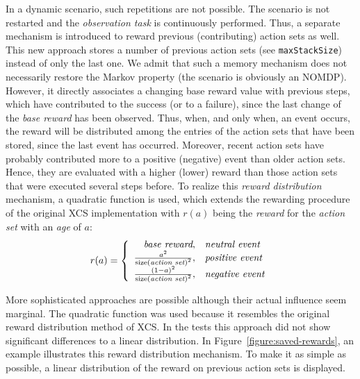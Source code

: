 \documentclass{sig-alternate}
\begin{document}
In a dynamic scenario, such repetitions are not possible. The scenario is not restarted and the \emph{observation task} is continuously performed. Thus, a separate mechanism is introduced to reward previous (contributing) action sets as well. This new approach stores a number of previous action sets (see \verb|maxStackSize|) instead of only the last one. We admit that such a memory mechanism does not necessarily restore the Markov property (the scenario is obviously an NOMDP). However, it directly associates a changing base reward value with previous steps, which have contributed to the success (or to a failure), since the last change of the \emph{base reward} has been observed. %
Thus, when, and only when, an event occurs, the reward will be distributed among the entries of the action sets that have been stored, since the last event has occurred. Moreover, recent action sets have probably contributed more to a positive (negative) event than older action sets. Hence, they are evaluated with a higher (lower) reward than those action sets that were executed several steps before. To realize this \emph{reward distribution} mechanism, a quadratic function is used, which extends the rewarding procedure of the original XCS implementation with $r(a)$ being the \emph{reward} for the \emph{action set} with an \emph{age} of $a$:
$$ %
	r(a) = 
	\left\{ \begin{array}{r@{,\quad}l}
		\emph{base reward} & \mbox{\emph{neutral event}}\\  	
		\frac{{a}^{2}}{{\mathrm{size(\emph{action set})}}^{2}} & \mbox{\emph{positive event}} \\
  		\frac{{(1 - a)}^{2}}{{\mathrm{size(\emph{action set})}}^{2}} & \mbox{\emph{negative event}}
  	\end{array} \right.
$$ %

More sophisticated approaches are possible although their actual influence seem marginal. The quadratic function was used because it resembles the original reward distribution method of XCS. In the tests this approach did not show significant differences to a linear distribution. In Figure~\ref{figure:saved-rewards}, an example illustrates this reward distribution mechanism. To make it as simple as possible, a linear distribution of the reward on previous action sets is displayed.  


%
\end{document}
